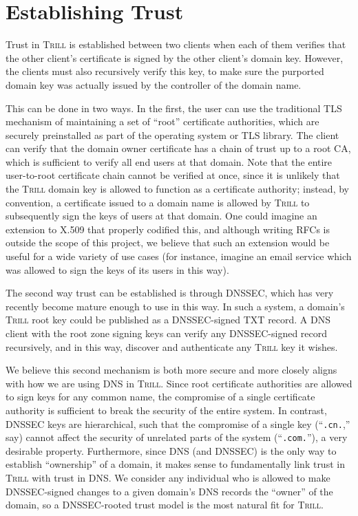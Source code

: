 \documentclass[11pt]{article}
\newcommand{\Trill}{\textsc{Trill}\xspace}
\begin{document}
\section*{Establishing Trust}
Trust in \Trill is established between two clients when each of them verifies
that the other client's certificate is signed by the other client's domain key.
However, the clients must also recursively verify this key, to make sure the
purported domain key was actually issued by the controller of the domain name.

This can be done in two ways. In the first, the user can use the traditional TLS
mechanism of maintaining a set of ``root'' certificate authorities, which are
securely preinstalled as part of the operating system or TLS library. The client
can verify that the domain owner certificate has a chain of trust up to a root
CA, which is sufficient to verify all end users at that domain. Note that the
entire user-to-root certificate chain cannot be verified at once, since it is
unlikely that the \Trill domain key is allowed to function as a certificate
authority; instead, by convention, a certificate issued to a domain name is
allowed by \Trill to subsequently sign the keys of users at that domain. One
could imagine an extension to X.509 that properly codified this, and although
writing RFCs is outside the scope of this project, we believe that such an
extension would be useful for a wide variety of use cases (for instance, imagine
an email service which was allowed to sign the keys of its users in this way).

The second way trust can be established is through DNSSEC, which has very
recently become mature enough to use in this way. In such a system, a domain's
\Trill root key could be published as a DNSSEC-signed TXT record. A DNS client
with the root zone signing keys can verify any DNSSEC-signed record recursively,
and in this way, discover and authenticate any \Trill key it wishes.

We believe this second mechanism is both more secure and more closely aligns
with how we are using DNS in \Trill. Since root certificate authorities are
allowed to sign keys for any common name, the compromise of a single certificate
authority is sufficient to break the security of the entire system. In contrast,
DNSSEC keys are hierarchical, such that the compromise of a single key
(``\verb`.cn.`,'' say) cannot affect the security of unrelated parts of the system
(``\verb`.com.`''), a very desirable property. Furthermore, since DNS (and
DNSSEC) is the only way to establish ``ownership'' of a domain, it makes sense
to fundamentally link trust in \Trill with trust in DNS. We consider any
individual who is allowed to make DNSSEC-signed changes to a given domain's DNS
records the ``owner'' of the domain, so a DNSSEC-rooted trust model is the most
natural fit for \Trill.
\end{document}
